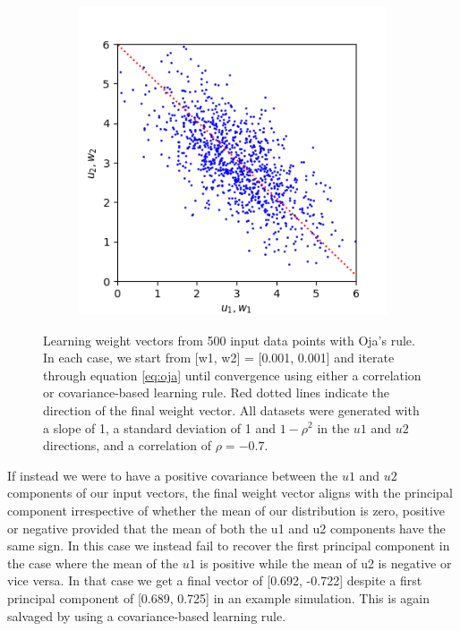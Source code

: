 \documentclass{article}
\begin{document}
\begin{figure}[h]
\begin{subfigure}[t]{0.30\linewidth}
		\label{fig:sim2mul}	
	\end{subfigure}%
	\hspace{0.03\linewidth}
	\begin{subfigure}[t]{0.30\linewidth}
		\centering
		\includegraphics[width = 1.0\linewidth, trim={0 0 0 0}, clip=true]{figures/2d_sim3.png}
		\label{fig:sim3mul}	
	\end{subfigure}%
\caption{Learning weight vectors from 500 input data points with Oja's rule. In each case, we start from [w1, w2] = [0.001, 0.001] and iterate through equation \ref{eq:oja} until convergence using either a correlation or covariance-based learning rule. Red dotted lines indicate the direction of the final weight vector. All datasets were generated with a slope of 1, a standard deviation of 1 and $1-\rho^2$ in the $u1$ and $u2$ directions, and a correlation of $\rho = -0.7$.}
\label{fig:multiplicative}
\end{figure}

If instead we were to have a positive covariance between the $u1$ and $u2$ components of our input vectors, the final weight vector aligns with the principal component irrespective of whether the mean of our distribution is zero, positive or negative provided that the mean of both the u1 and u2 components have the same sign. In this case we instead fail to recover the first principal component in the case where the mean of the $u1$ is positive while the mean of u2 is negative or vice versa. In that case we get a final vector of [0.692, -0.722] despite a first principal component of [0.689, 0.725] in an example simulation. This is again salvaged by using a covariance-based learning rule.
\end{document}
